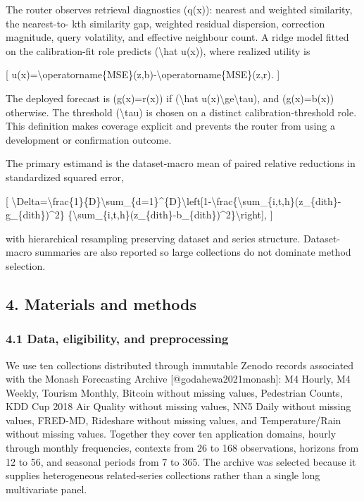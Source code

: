 \documentclass[
]{article}
\begin{document}
The router observes retrieval diagnostics (q(x)): nearest and weighted
similarity, the nearest-to- kth similarity gap, weighted residual
dispersion, correction magnitude, query volatility, and effective
neighbour count. A ridge model fitted on the calibration-fit role
predicts (\textbackslash hat u(x)), where realized utility is

{[}
u(x)=\textbackslash operatorname\{MSE\}(z,b)-\textbackslash operatorname\{MSE\}(z,r).
{]}

The deployed forecast is (g(x)=r(x)) if (\textbackslash hat
u(x)\textbackslash ge\textbackslash tau), and (g(x)=b(x)) otherwise. The
threshold (\textbackslash tau) is chosen on a distinct
calibration-threshold role. This definition makes coverage explicit and
prevents the router from using a development or confirmation outcome.

The primary estimand is the dataset-macro mean of paired relative
reductions in standardized squared error,

{[}
\textbackslash Delta=\textbackslash frac\{1\}\{D\}\textbackslash sum\_\{d=1\}\^{}\{D\}\textbackslash left{[}1-\textbackslash frac\{\textbackslash sum\_\{i,t,h\}(z\_\{dith\}-g\_\{dith\})\^{}2\}
\{\textbackslash sum\_\{i,t,h\}(z\_\{dith\}-b\_\{dith\})\^{}2\}\textbackslash right{]},
{]}

with hierarchical resampling preserving dataset and series structure.
Dataset-macro summaries are also reported so large collections do not
dominate method selection.

\subsection{4. Materials and methods}\label{4-materials-and-methods}

\subsubsection{4.1 Data, eligibility, and
preprocessing}\label{41-data-eligibility-and-preprocessing}

We use ten collections distributed through immutable Zenodo records
associated with the Monash Forecasting Archive
{[}@godahewa2021monash{]}: M4 Hourly, M4 Weekly, Tourism Monthly,
Bitcoin without missing values, Pedestrian Counts, KDD Cup 2018 Air
Quality without missing values, NN5 Daily without missing values,
FRED-MD, Rideshare without missing values, and Temperature/Rain without
missing values. Together they cover ten application domains, hourly
through monthly frequencies, contexts from 26 to 168 observations,
horizons from 12 to 56, and seasonal periods from 7 to 365. The archive
was selected because it supplies heterogeneous related-series
collections rather than a single long multivariate panel.
\end{document}
